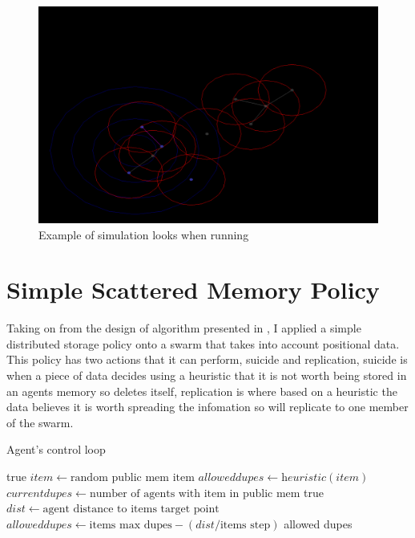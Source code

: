 \documentclass{UoYCSproject}
\begin{document}
\begin{figure}[htb]
\label{fig:Connarea}
\begin{center}
\centering
\includegraphics[width=\linewidth]{"./Connarea.png"}
\caption{Example of simulation looks when running}
\end{center}
\end{figure}



\section{Simple Scattered Memory Policy}
\label{sec:Simple1}

Taking on from the design of algorithm presented in \cite{Distributed Storage}, I applied a simple distributed storage policy onto a swarm that takes into account positional data.
This policy has two actions that it can perform, suicide and replication, suicide is when a piece of data decides using a heuristic that it is not worth being stored in an agents memory so deletes itself, replication is where based on a heuristic the data believes it is worth spreading the infomation so will replicate to one member of the swarm.


\begin{algorithm}
\caption{Agent's control loop}
\label{Agent_Control_Loop}
\begin{algorithmic}[1]
\State {}
\State
{}
\State {}
\State \Return true
\EndIf
\State
\State $item \gets \text{random public mem item}$
\State $allowed dupes \gets \textit{heuristic}(item)$
\State $current dupes \gets \text{number of agents with item in public mem}$
\State
{}
\State {}
\State {}
\EndIf
\State
\State \Return true
\EndProcedure
\State
{}
\State $dist  \gets \text{agent distance to items target point}$
\State $allowed dupes \gets \text{items max dupes} - (dist / \text{items step})$
\State
{}
\State {}
\Else
\State \Return allowed dupes
\EndIf
\EndProcedure
\end{algorithmic}
\end{algorithm}
\end{document}
